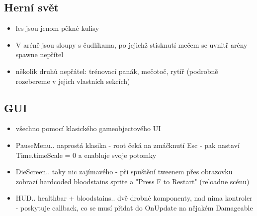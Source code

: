 \subsection{Herní svět}
\begin{itemize}
  \item les jsou jenom pěkné kulisy
  \item V aréně jsou sloupy s čudlíkama, po jejichž stisknutí mečem se uvnitř arény spawne nepřítel
  \item několik druhů nepřátel: trénovací panák, mečotoč, rytíř (podrobně rozebereme v jejich vlastních sekcích)
\end{itemize}

\subsection{GUI}
\begin{itemize}
  \item všechno pomocí klasického gameobjectového UI
  \item PauseMenu.. naprostá klasika - root čeká na zmáčknutí Esc - pak nastaví Time.timeScale = 0 a enabluje svoje potomky
  \item DieScreen.. taky nic zajímavého - při spuštění tweenem přes obrazovku zobrazí hardcoded bloodstains sprite a "Press F to Restart" (reloadne scénu)
  \item HUD.. healthbar + bloodstains.. dvě drobné komponenty, nad nima kontroler - poskytuje callback, co se musí přidat do OnUpdate na nějakém Damageable
\end{itemize}


